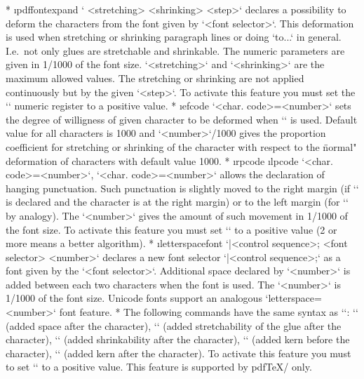 {\begitems
* \i pdffontexpand 
  ` <stretching> <shrinking> <step>`
  declares a possibility to deform the characters from the font given by
  `<font selector>`. This deformation is used when stretching or shrinking
  paragraph lines or doing `\hbox to{...}` in general. I.e.\ not only glues are
  stretchable and shrinkable. The numeric parameters are given in 1/1000
  of the font size. `<stretching>` and `<shrinking>` are the maximum allowed
  values. The stretching or shrinking are not applied continuously but by
  the given `<step>`.
  To activate this feature you must set the \x`\pdfadjustspacing`
  numeric register to a positive value. 
* \i efcode `<char. code>=<number>`
  sets the degree of willigness of given character to be deformed when
  `\pdffontexpand` is used. Default value for all
  characters is 1000 and `<number>`/1000 gives the proportion coefficient for
  stretching or shrinking of the character with respect to the \"normal" deformation
  of characters with default value 1000.
* \i rpcode \i lpcode 
  `<char. code>=<number>`,
  `<char. code>=<number>` allows the declaration of
  hanging punctuation. Such punctuation is slightly moved to the right
  margin (if `\rpcode` is declared and the character is at the right margin) 
  or to the left margin (for `\lpcode` by analogy).
  The `<number>` gives the amount of such movement in 1/1000 of the font size.
  To activate this feature you must set \x`\pdfprotrudechars` to
  a positive value (2 or more means a better algorithm).
* \i letterspacefont
  ` |<control sequence>; <font selector> <number>`
  declares a new font selector `|<control sequence>;` as a font given by
  the `<font selector>`. Additional space declared by `<number>` is added
  between each two characters when the font is used. The `<number>` is 1/1000 of
  the font size. Unicode fonts support an analogous
  `letterspace=<number>` font feature. 
* The following commands have the same syntax as `\rpcode`:
  \x`\knbscode` (added space after the character),
  \x`\stbscode` (added stretchability of the glue after the character),
  \x`\shbscode` (added shrinkability after the character),
  \x`\knbccode` (added kern before the character),
  \x`\knaccode` (added kern after the character).
  To activate this feature you must to set
  \x`\pdfadjustinterwordglue` to a positive value.
  This feature is supported by pdf\TeX/ only.
\enditems

\goodbreak{}

}

